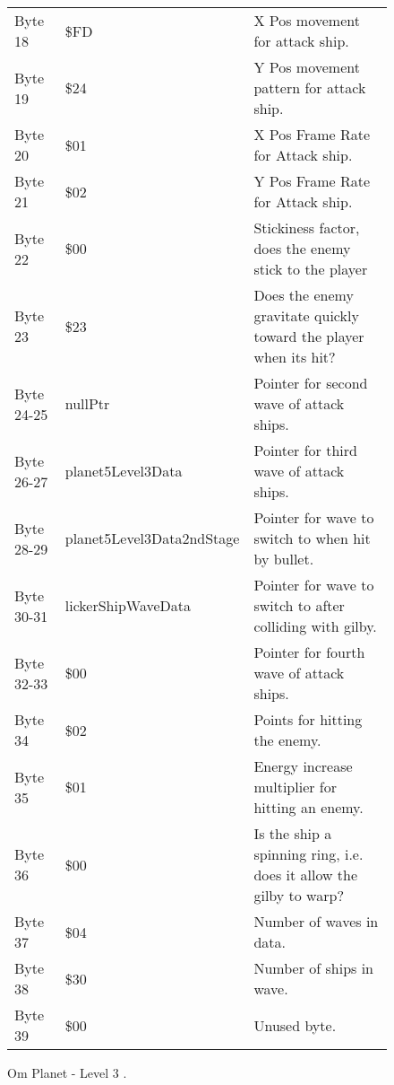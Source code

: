 \begin{figure}[H]
{\begin{adjustbox}{width=12cm}
\begin{tabular}{lll}
 Byte 18    & \$FD                       & X Pos movement for attack ship.                                     \\
 Byte 19    & \$24                       & Y Pos movement pattern for attack ship.                             \\
 Byte 20    & \$01                       & X Pos Frame Rate for Attack ship.                                   \\
 Byte 21    & \$02                       & Y Pos Frame Rate for Attack ship.                                   \\
 Byte 22    & \$00                       & Stickiness factor, does the enemy stick to the player               \\
 Byte 23    & \$23                       & Does the enemy gravitate quickly toward the player when its hit?    \\
 Byte 24-25 & nullPtr                   & Pointer for second wave of attack ships.                            \\
 Byte 26-27 & planet5Level3Data         & Pointer for third wave of attack ships.                             \\
 Byte 28-29 & planet5Level3Data2ndStage & Pointer for wave to switch to when hit by bullet.                   \\
 Byte 30-31 & lickerShipWaveData        & Pointer for  wave to switch to after colliding with gilby.          \\
 Byte 32-33 & \$00                       & Pointer for fourth wave of attack ships.                            \\
 Byte 34    & \$02                       & Points for hitting the enemy.                                       \\
 Byte 35    & \$01                       & Energy increase multiplier for hitting an enemy.                    \\
 Byte 36    & \$00                       & Is the ship a spinning ring, i.e. does it allow the gilby to warp?  \\
 Byte 37    & \$04                       & Number of waves in data.                                            \\
 Byte 38    & \$30                       & Number of ships in wave.                                            \\
 Byte 39    & \$00                       & Unused byte.                                                        \\
\bottomrule
\end{tabular}

  \end{adjustbox}

  }\caption*{Om Planet - Level 3
.}
\end{figure}


